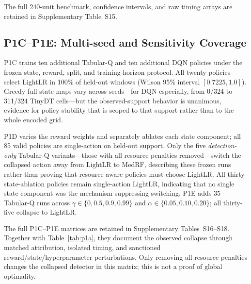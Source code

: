 The full 240-unit benchmark, confidence intervals, and raw timing arrays are retained in Supplementary Table~S15.

\subsection{P1C--P1E: Multi-seed and Sensitivity Coverage}
P1C trains ten additional Tabular-Q and ten additional DQN policies under the frozen state, reward, split, and training-horizon protocol. All twenty policies select LightLR in 100\% of held-out windows (Wilson 95\% interval $[0.7225, 1.0]$). Greedy full-state maps vary across seeds---for DQN especially, from 0/324 to 311/324 TinyDT cells---but the observed-support behavior is unanimous, evidence for policy stability that is scoped to that support rather than to the whole encoded grid.

P1D varies the reward weights and separately ablates each state component; all 85 valid policies are single-action on held-out support. Only the five \emph{detection-only} Tabular-Q variants---those with all resource penalties removed---switch the collapsed action away from LightLR to MedRF, describing these frozen runs rather than proving that resource-aware policies must choose LightLR. All thirty state-ablation policies remain single-action LightLR, indicating that no single state component was the mechanism suppressing switching. P1E adds 35 Tabular-Q runs across $\gamma\in\{0,0.5,0.9,0.99\}$ and $\alpha\in\{0.05,0.10,0.20\}$; all thirty-five collapse to LightLR.

The full P1C--P1E matrices are retained in Supplementary Tables~S16--S18. Together with Table~\ref{tab:p1a}, they document the observed collapse through matched attribution, isolated timing, and sanctioned reward/state/hyperparameter perturbations. Only removing all resource penalties changes the collapsed detector in this matrix; this is not a proof of global optimality.
